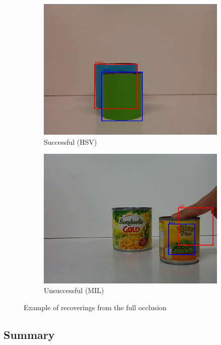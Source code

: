 \begin{figure}
\centering
\begin{subfigure}{0.48\linewidth}
\includegraphics[width=\linewidth]{img/experiments/color-occlusion.png}
\caption{Successful (HSV)}
\end{subfigure}
\begin{subfigure}{0.48\linewidth}
\includegraphics[width=\linewidth]{img/experiments/occlusion.png}
\caption{Unsuccessful (MIL)}
\end{subfigure}
\caption{Example of recoverings from the full occlusion}
\label{fig:occlusion}
\end{figure}

\subsection{Summary}

